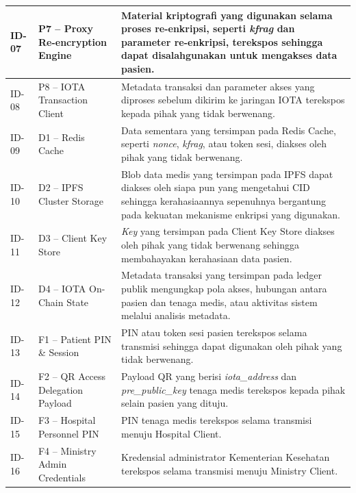\begin{xltabular}{\textwidth}{|>{\centering\arraybackslash}p{1.8cm}|>{\raggedright\arraybackslash}p{3.2cm}|X|}
    ID-07 &
    P7 -- Proxy Re-encryption Engine &
    Material kriptografi yang digunakan selama proses re-enkripsi, seperti \textit{kfrag} dan parameter re-enkripsi, terekspos sehingga dapat disalahgunakan untuk mengakses data pasien. \\
    \hline

    ID-08 &
    P8 -- IOTA Transaction Client &
    Metadata transaksi dan parameter akses yang diproses sebelum dikirim ke jaringan IOTA terekspos kepada pihak yang tidak berwenang. \\
    \hline

    ID-09 &
    D1 -- Redis Cache &
    Data sementara yang tersimpan pada Redis Cache, seperti \textit{nonce}, \textit{kfrag}, atau token sesi, diakses oleh pihak yang tidak berwenang. \\
    \hline

    ID-10 &
    D2 -- IPFS Cluster Storage &
    Blob data medis yang tersimpan pada IPFS dapat diakses oleh siapa pun yang mengetahui CID sehingga kerahasiaannya sepenuhnya bergantung pada kekuatan mekanisme enkripsi yang digunakan. \\
    \hline

    ID-11 &
    D3 -- Client Key Store &
    \textit{Key} yang tersimpan pada Client Key Store diakses oleh pihak yang tidak berwenang sehingga membahayakan kerahasiaan data pasien. \\
    \hline

    ID-12 &
    D4 -- IOTA On-Chain State &
    Metadata transaksi yang tersimpan pada ledger publik mengungkap pola akses, hubungan antara pasien dan tenaga medis, atau aktivitas sistem melalui analisis metadata. \\
    \hline

    ID-13 &
    F1 -- Patient PIN \& Session &
    PIN atau token sesi pasien terekspos selama transmisi sehingga dapat digunakan oleh pihak yang tidak berwenang. \\
    \hline

    ID-14 &
    F2 -- QR Access Delegation Payload &
    Payload QR yang berisi \textit{iota\_address} dan \textit{pre\_public\_key} tenaga medis terekspos kepada pihak selain pasien yang dituju. \\
    \hline

    ID-15 &
    F3 -- Hospital Personnel PIN &
    PIN tenaga medis terekspos selama transmisi menuju Hospital Client. \\
    \hline

    ID-16 &
    F4 -- Ministry Admin Credentials &
    Kredensial administrator Kementerian Kesehatan terekspos selama transmisi menuju Ministry Client. \\
    \hline


\end{xltabular}
